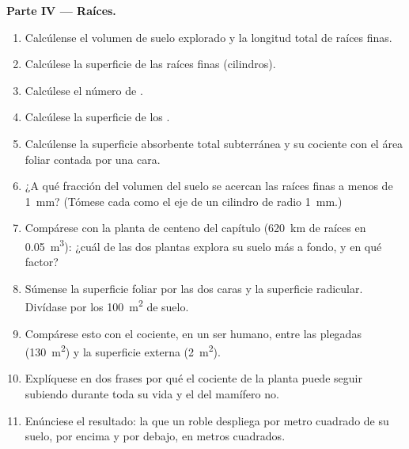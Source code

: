 \begin{problem}
\medskip
\noindent\textbf{Parte IV --- Raíces.}
\begin{enumerate}[resume]
  \item Calcúlense el volumen de suelo explorado y la longitud total de
        raíces finas.
  \item Calcúlese la superficie de las raíces finas (cilindros).
  \item Calcúlese el número de .
  \item Calcúlese la superficie de los .
  \item Calcúlense la superficie absorbente total subterránea y su
        cociente con el área foliar contada por una cara.
  \item ¿A qué fracción del volumen del suelo se acercan las raíces finas
        a menos de \qty{1}{mm}? (Tómese cada  como el eje de un
        cilindro de radio \qty{1}{mm}.)
  \item Compárese con la planta de centeno del capítulo (\qty{620}{km} de
        raíces en \qty{0.05}{m^3}): ¿cuál de las dos plantas explora su
        suelo más a fondo, y en qué factor?
  \item Súmense la superficie foliar por las dos caras y la superficie
        radicular. Divídase por los \qty{100}{m^2} de suelo.
  \item Compárese esto con el cociente, en un ser humano, entre las
         plegadas (\qty{130}{m^2}) y la
        superficie externa (\qty{2}{m^2}).
  \item Explíquese en dos frases por qué el cociente de la planta puede
        seguir subiendo durante toda su vida y el del mamífero no.
  \item Enúnciese el resultado: la  que un roble
        despliega por metro cuadrado de su suelo, por encima y por debajo,
        en metros cuadrados.
\end{enumerate}
\end{problem}
